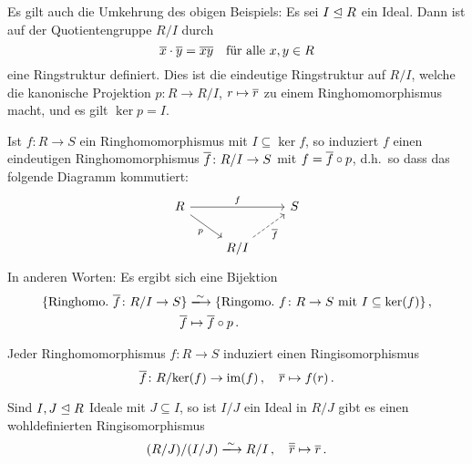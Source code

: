 Es gilt auch die Umkehrung des obigen Beispiels:
Es sei $I \mathrel{\trianglelefteq} R$ ein Ideal.
Dann ist auf der Quotientengruppe $R/I$ durch
\[
    \overline{x} \cdot \overline{y}
  = \overline{xy}
  \quad
  \text{für alle $x, y \in R$}
\]
eine Ringstruktur definiert.
Dies ist die eindeutige Ringstruktur auf $R/I$, welche die kanonische Projektion $p \colon R \to R/I$, $r \mapsto \overline{r}$ zu einem Ringhomomorphismus macht, und es gilt $\ker p = I$.

\begin{theorem}
  Ist $f \colon R \to S$ ein Ringhomomorphismus mit $I \subseteq \ker f$, so induziert $f$ einen eindeutigen Ringhomomorphismus $\overline{f} \colon R/I \to S$ mit $f = \overline{f} \circ p$, d.h.\ so dass das folgende Diagramm kommutiert:
  \[
    \begin{tikzcd}
        R
        \arrow{rr}[above]{f}
        \arrow{dr}[below left]{p}
      & {}
      & S
      \\
        {}
      & R/I
        \arrow[dashed]{ru}[below right]{\induced{f}}
      & {}
    \end{tikzcd}
  \]
  In anderen Worten:
  Es ergibt sich eine Bijektion
  \begin{align*}
                            \{ \text{Ringhomo.\ $\induced{f} \colon R/I \to S$} \}
    &\xlongrightarrow{\sim} \{ \text{Ringomo.\ $f \colon R \to S$ mit $I \subseteq \ker(f)$} \} \,,  \\
                            \induced{f}
    &\mapsto                \induced{f} \circ p \,.
  \end{align*}
\end{theorem}

\begin{corollary}[1.\ Isomorphiesatz]
  Jeder Ringhomomorphismus $f \colon R \to S$ induziert einen Ringisomorphismus
  \[
            \overline{f}
    \colon  R/{\ker(f)}
    \to     \operatorname{im}(f) \,,
    \quad   \overline{r}
    \mapsto f(r) \,.
  \]
\end{corollary}

\begin{corollary}[2.\ Isomorphiesatz]
  Sind $I, J \mathrel{\trianglelefteq} R$ Ideale mit $J \subseteq I$, so ist $I/J$ ein Ideal in $R/J$ gibt es einen wohldefinierten Ringisomorphismus
  \[
                            (R/J)/(I/J)
    \xlongrightarrow{\sim}  R/I \,,
    \quad                   \class{\class{r}}
    \mapsto                 \class{r} \,.
  \]

\end{corollary}

